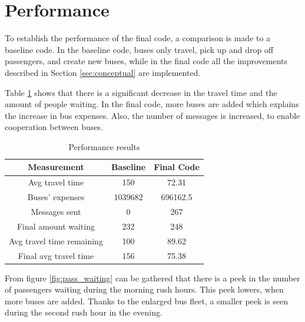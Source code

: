 \section{Performance}
To establish the performance of the final code, a comparison is made to a baseline code. In the baseline code, buses only travel, pick up and drop off passengers, and create new buses, while in the final code all the improvements described in Section \ref{sec:conceptual} are implemented.

Table \ref{table:table1} shows that there is a significant decrease in the travel time and the amount of people waiting. In the final code, more buses are added which explains the increase in bus expenses. Also, the number of messages is increased, to enable cooperation between buses. 

\begin{table}[htbp]
\centering
\begin{tabular}{ |c|c|c|  }
 \hline
  Measurement & Baseline & Final Code \\
 \hline
  Avg travel time & 150 & 72.31 \\
  Buses' expenses & 1039682 & 696162.5 \\
  Messages sent & 0 & 267  \\
  Final amount waiting & 232 & 248 \\
  Avg travel time remaining & 100 & 89.62 \\
  Final avg travel time & 156 & 75.38 \\
 \hline
\end{tabular}
\label{table:table1}
\caption{Performance results}
\end{table}

From figure \ref{fig:pass_waiting} can be gathered that there is a peek in the number of passengers waiting during the morning rush hours. This peek lowers, when more buses are added. Thanks to the enlarged bus fleet, a smaller peek is seen during the second rush hour in the evening.

